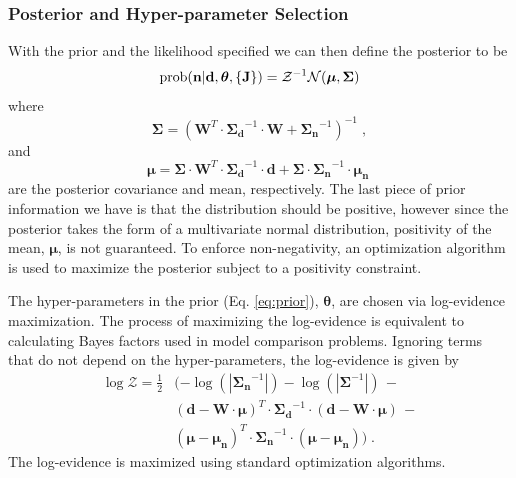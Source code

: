 \subsubsection{Posterior and Hyper-parameter Selection}
With the prior and the likelihood specified we can then define the posterior to be
\begin{equation}\label{eq:posterior}
    \rm{prob}(\mathbf{n}| \mathbf{d}, \boldsymbol{\theta}, \{\mathbf{J}\}) = \mathcal{Z}^{-1} \mathcal{N}( \boldsymbol{\mu}, \mathbf{\Sigma})
\end{equation}
where
\begin{equation}
    \mathbf{\Sigma} = (\mathbf{W}^T \cdot \mathbf{\Sigma_d}^{-1} \cdot \mathbf{W} + \mathbf{\Sigma_n}^{-1})^{-1} \; , 
\end{equation}
and
\begin{equation}
    \boldsymbol{\mu} = \mathbf{\Sigma}\cdot\mathbf{W}^T\cdot\mathbf{\Sigma_d}^{-1} \cdot \mathbf{d} + \mathbf{\Sigma} \cdot \mathbf{\Sigma_n}^{-1} \cdot \boldsymbol{\mu_n}\;
\end{equation}
are the posterior covariance and mean, respectively.
The last piece of prior information we have is that the distribution should be positive, however since the posterior takes the form of a multivariate normal distribution, positivity of the mean, $\boldsymbol{\mu}$, is not guaranteed.
To enforce non-negativity, an optimization algorithm is used to maximize the posterior subject to a positivity constraint.

The hyper-parameters in the prior (Eq. \ref{eq:prior}), $\boldsymbol{\theta}$, are chosen via log-evidence maximization. The process of maximizing the log-evidence is equivalent to calculating Bayes factors used in model comparison problems.
Ignoring terms that do not depend on the hyper-parameters, the log-evidence is given by
\begin{equation}
\begin{aligned}\label{eq:log_evidence}
    \log{\mathcal{Z}} = \frac{1}{2} &(-\log(|\mathbf{\Sigma_n}^{-1}|) -\log(|\mathbf{\Sigma}^{-1}|)\,- \\
    & (\mathbf{d} - \mathbf{W} \cdot \boldsymbol{\mu})^T \cdot \mathbf{\Sigma_d}^{-1} \cdot (\mathbf{d} - \mathbf{W}\cdot\boldsymbol{\mu})\,- \\
    & (\boldsymbol{\mu} - \boldsymbol{\mu_n})^T \cdot \mathbf{\Sigma_n}^{-1} \cdot (\boldsymbol{\mu} - \boldsymbol{\mu_n}) )\;. 
\end{aligned}
\end{equation}
The log-evidence is maximized using standard optimization algorithms.

